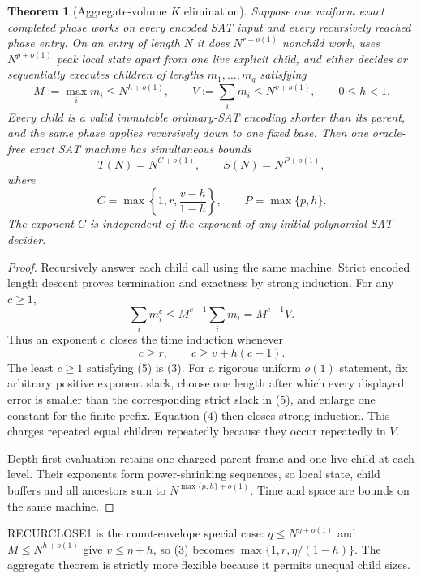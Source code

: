\documentclass[11pt]{article}
\newtheorem{theorem}{Theorem}
\begin{document}
\begin{theorem}[Aggregate-volume $K$ elimination]\label{thm:aggregate}
Suppose one uniform exact completed phase works on every encoded SAT input and
every recursively reached phase entry.  On an entry of length $N$ it does
$N^{r+o(1)}$ nonchild work, uses $N^{p+o(1)}$ peak local state apart from one
live explicit child, and either decides or sequentially executes children of
lengths $m_1,\ldots,m_q$ satisfying
\[
 M:=\max_i m_i\le N^{h+o(1)},\qquad
 V:=\sum_i m_i\le N^{v+o(1)},\qquad 0\le h<1.              \tag{1}
\]
Every child is a valid immutable ordinary-SAT encoding shorter than its
parent, and the same phase applies recursively down to one fixed base.
Then one oracle-free exact SAT machine has simultaneous bounds
\[
 T(N)=N^{C+o(1)},\qquad S(N)=N^{P+o(1)},                   \tag{2}
\]
where
\[
 \boxed{C=\max\left\{1,r,\frac{v-h}{1-h}\right\}},\qquad
 \boxed{P=\max\{p,h\}}.                                   \tag{3}
\]
The exponent $C$ is independent of the exponent of any initial polynomial
SAT decider.
\end{theorem}

\begin{proof}
Recursively answer each child call using the same machine.  Strict encoded
length descent proves termination and exactness by strong induction.  For
any $c\ge1$,
\[
 \sum_i m_i^c\le M^{c-1}\sum_i m_i=M^{c-1}V.              \tag{4}
\]
Thus an exponent $c$ closes the time induction whenever
\[
 c\ge r,\qquad c\ge v+h(c-1).                              \tag{5}
\]
The least $c\ge1$ satisfying (5) is (3).  For a rigorous uniform
$o(1)$ statement, fix arbitrary positive exponent slack, choose one length
after which every displayed error is smaller than the corresponding strict
slack in (5), and enlarge one constant for the finite prefix.  Equation (4)
then closes strong induction.  This charges repeated equal children
repeatedly because they occur repeatedly in $V$.

Depth-first evaluation retains one charged parent frame and one live child at
each level.  Their exponents form power-shrinking sequences, so local state,
child buffers and all ancestors sum to $N^{\max\{p,h\}+o(1)}$.  Time and
space are bounds on the same machine.
\end{proof}

RECURCLOSE1 is the count-envelope special case: $q\le N^{\eta+o(1)}$ and
$M\le N^{h+o(1)}$ give $v\le\eta+h$, so (3) becomes
$\max\{1,r,\eta/(1-h)\}$.  The aggregate theorem is strictly more flexible
because it permits unequal child sizes.
\end{document}
